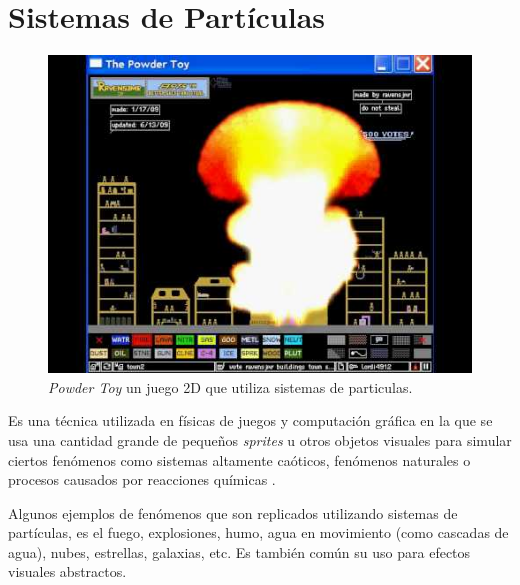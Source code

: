 \section{Sistemas de Partículas}
\setlength\intextsep{0pt}
\begin{figure}
\includegraphics[width=\linewidth]{media/powdertoy.jpg}
\caption{\emph{Powder Toy} un juego 2D que utiliza sistemas de particulas.}
\label{fig:particles}
\end{figure}
Es una técnica utilizada en físicas de juegos y computación gráfica en la que se usa una cantidad grande de pequeños \emph{sprites} u otros objetos visuales para simular ciertos fenómenos como sistemas altamente caóticos, fenómenos naturales o procesos causados por reacciones químicas \cite{vanderburg_particlesystem}. 

Algunos ejemplos de fenómenos que son replicados utilizando sistemas de partículas, es el fuego, explosiones, humo, agua en movimiento (como cascadas de agua), nubes, estrellas, galaxias, etc. Es también común su uso para efectos visuales abstractos.
